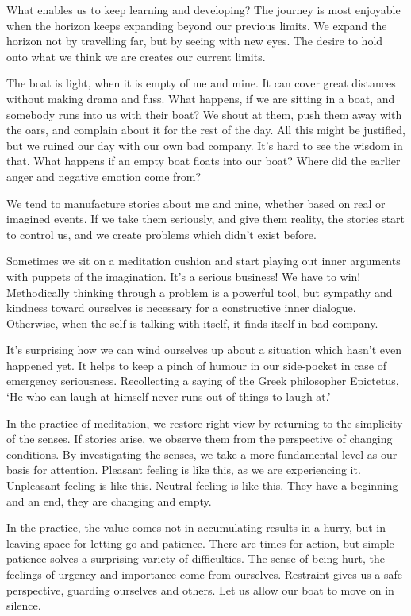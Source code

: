 
What enables us to keep learning and developing? The journey is most
enjoyable when the horizon keeps expanding beyond our previous limits.
We expand the horizon not by travelling far, but by seeing with new
eyes. The desire to hold onto what we think we are creates our current
limits.

The boat is light, when it is empty of me and mine. It can cover great
distances without making drama and fuss. What happens, if we are sitting
in a boat, and somebody runs into us with their boat? We shout at them,
push them away with the oars, and complain about it for the rest of the
day. All this might be justified, but we ruined our day with our own bad
company. It's hard to see the wisdom in that. What happens if an empty
boat floats into our boat? Where did the earlier anger and negative
emotion come from?

We tend to manufacture stories about me and mine, whether based on real
or imagined events. If we take them seriously, and give them reality,
the stories start to control us, and we create problems which didn't
exist before.

\enlargethispage*{\baselineskip}

Sometimes we sit on a meditation cushion and start playing out inner
arguments with puppets of the imagination. It's a serious business! We
have to win! Methodically thinking through a problem is a powerful tool,
but sympathy and kindness toward ourselves is necessary for a
constructive inner dialogue. Otherwise, when the self is talking with
itself, it finds itself in bad company.


It's surprising how we can wind ourselves up about a situation which
hasn't even happened yet. It helps to keep a pinch of humour in our
side-pocket in case of emergency seriousness. Recollecting a saying of
the Greek philosopher Epictetus, `He who can laugh at himself never runs
out of things to laugh at.'


In the practice of meditation, we restore right view by returning to the
simplicity of the senses. If stories arise, we observe them from the
perspective of changing conditions. By investigating the senses, we take
a more fundamental level as our basis for attention. Pleasant feeling is
like this, as we are experiencing it. Unpleasant feeling is like this.
Neutral feeling is like this. They have a beginning and an end, they are
changing and empty.

In the practice, the value comes not in accumulating results in a hurry,
but in leaving space for letting go and patience. There are times for
action, but simple patience solves a surprising variety of difficulties.
The sense of being hurt, the feelings of urgency and importance come
from ourselves. Restraint gives us a safe perspective, guarding
ourselves and others. Let us allow our boat to move on in silence.

